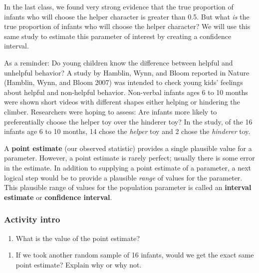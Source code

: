 \documentclass[
]{report}
\providecommand{\tightlist}{%
  \setlength{\itemsep}{0pt}\setlength{\parskip}{0pt}}
\begin{document}
In the last class, we found very strong evidence that the true proportion of infants who will choose the helper character is greater than 0.5. But what \emph{is} the true proportion of infants who will choose the helper character? We will use this same study to estimate this parameter of interest by creating a confidence interval.

As a reminder: Do young children know the difference between helpful and unhelpful behavior? A study by Hamblin, Wynn, and Bloom reported in Nature (Hamblin, Wynn, and Bloom 2007) was intended to check young kids' feelings about helpful and non-helpful behavior. Non-verbal infants ages 6 to 10 months were shown short videos with different shapes either helping or hindering the climber. Researchers were hoping to assess: Are infants more likely to preferentially choose the helper toy over the hinderer toy? In the study, of the 16 infants age 6 to 10 months, 14 chose the \emph{helper} toy and 2 chose the \emph{hinderer} toy.

A \textbf{point estimate} (our observed statistic) provides a single plausible value for a parameter. However, a point estimate is rarely perfect; usually there is some error in the estimate. In addition to supplying a point estimate of a parameter, a next logical step would be to provide a plausible \emph{range} of values for the parameter. This plausible range of values for the population parameter is called an \textbf{interval estimate} or \textbf{confidence interval}.

\hypertarget{activity-intro}{%
\subsubsection*{Activity intro}\label{activity-intro}}

\begin{enumerate}
\def\labelenumi{\arabic{enumi}.}
\tightlist
\item
  What is the value of the point estimate?
\end{enumerate}

\vspace{0.3in}

\begin{enumerate}
\def\labelenumi{\arabic{enumi}.}
\setcounter{enumi}{1}
\tightlist
\item
  If we took another random sample of 16 infants, would we get the exact same point estimate? Explain why or why not.
\end{enumerate}
\end{document}
